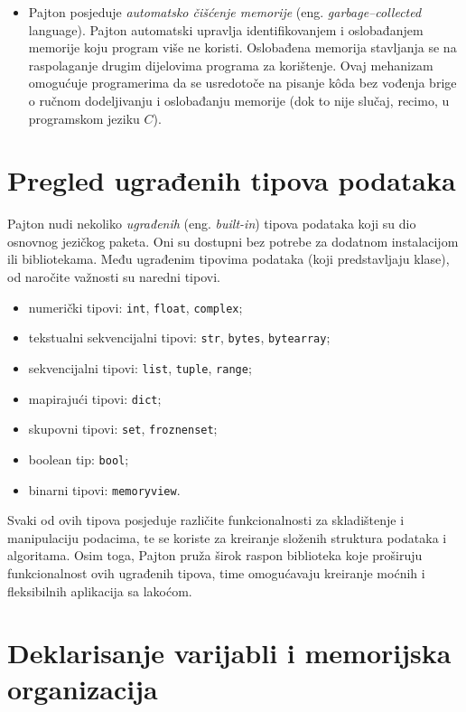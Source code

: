 \begin{itemize}
	\item Pajton posjeduje \textit{automatsko čišćenje memorije} (eng. \textit{garbage--collected} language).  Pajton automatski upravlja   identifikovanjem i oslobađanjem memorije koju program više ne koristi.  Oslobađena memorija  stavljanja se na raspolaganje drugim dijelovima programa za korištenje.   Ovaj mehanizam omogućuje  programerima  da se usredotoče na pisanje k\^oda bez vođenja brige o ručnom dodeljivanju i oslobađanju memorije (dok to nije slučaj, recimo, u programskom jeziku $C$).
\end{itemize}

\section{Pregled ugrađenih tipova podataka}

Pajton nudi nekoliko \textit{ugrađenih} (eng. \textit{built-in}) tipova podataka koji su dio osnovnog jezičkog paketa. Oni su dostupni bez potrebe za dodatnom instalacijom ili bibliotekama. Među ugrađenim tipovima podataka (koji predstavljaju klase), od naročite važnosti su naredni tipovi. 

\begin{itemize}
	\item  numerički tipovi: \texttt{int}, \texttt{float}, \texttt{complex};
	 \item  tekstualni sekvencijalni tipovi: \texttt{str}, \texttt{bytes}, \texttt{bytearray};
	\item  sekvencijalni tipovi: \texttt{list}, \texttt{tuple}, \texttt{range}; 
	\item  mapirajući tipovi: \texttt{dict};
	\item skupovni tipovi: \texttt{set}, \texttt{froznenset};
	\item  boolean tip: \texttt{bool};
	\item  binarni tipovi: \texttt{memoryview}.
\end{itemize}


Svaki od ovih tipova posjeduje različite funkcionalnosti za skladištenje i manipulaciju podacima, te se koriste za kreiranje složenih struktura podataka i algoritama. Osim toga, Pajton pruža širok raspon biblioteka koje proširuju funkcionalnost ovih ugrađenih tipova, time omogućavaju kreiranje moćnih i fleksibilnih aplikacija sa lakoćom.

\section{Deklarisanje varijabli i memorijska organizacija}

